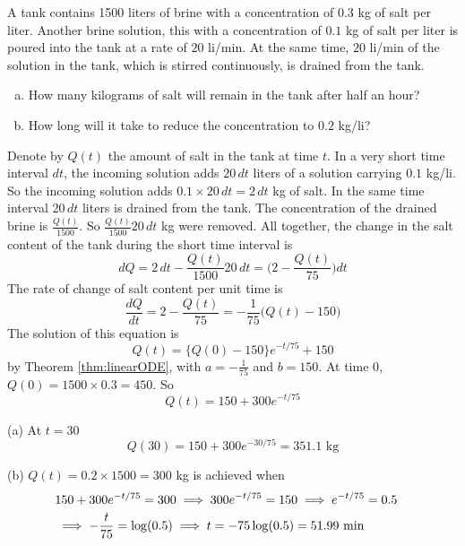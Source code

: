 \begin{eg}\label{eg:SDEmixingB}
A tank contains 1500 liters of brine with a concentration of $0.3$ kg of
salt per liter. Another brine solution, this with a concentration of
$0.1$ kg of salt per liter is poured into the tank at a rate of $20$ li/min.
At the same time, $20$ li/min of the solution in the tank, which is stirred
continuously, is drained from the tank.
\begin{enumerate}[(a)]
\item How many kilograms of salt will remain in the tank after
half an hour?
\item How long will it take to reduce the concentration to $0.2$
kg/li?
\end{enumerate}

\soln
Denote by $Q(t)$ the amount of salt in the tank at time $t$.
In a very short time interval $dt$, the incoming solution adds $20\, dt$
liters of a solution carrying $0.1$ kg/li. So the incoming solution adds
$0.1\times 20\, dt=2\, dt$ kg of salt. In the same time interval
$20\, dt$ liters is drained from the tank. The concentration of the
drained brine is $\frac{Q(t)}{1500}$. So $\frac{Q(t)}{1500} 20\, dt$ kg were
removed. All together, the change in the salt content of the tank during
the short time interval is
\begin{equation*}
dQ=2\, dt-\frac{Q(t)}{1500} 20\, dt
=\Big(2-\frac{Q(t)}{75}\Big) dt
\end{equation*}
The rate of change of salt content per unit time is
\begin{equation*}
\frac{dQ}{dt}=2-\frac{Q(t)}{75}
=-\frac{1}{75}\big(Q(t)-150\big)
\end{equation*}
The solution of this equation  is
\begin{equation*}
Q(t)=\big\{Q(0)-150\big\}e^{-t/75} + 150
\end{equation*}
by Theorem \ref{thm:linearODE}, with $a=-\frac{1}{75}$ and $b=150$.
At time $0$, $Q(0)=1500\times 0.3=450$. So
\begin{equation*}
Q(t)=150+300e^{-t/75}
\end{equation*}

\noindent (a) At $t=30$
\begin{equation*}
Q(30)=150+300e^{-30/75}=\text{351.1 kg}
\end{equation*}

\noindent (b) $Q(t)=0.2\times 1500=300$ kg is achieved when
\begin{align*}
&150+300e^{-t/75}=300\implies 300e^{-t/75}=150
\implies e^{-t/75}=0.5\cr
&\implies -\frac{t}{75}=\log (0.5)
\implies t=-75\log (0.5)=\text{51.99 min}
\end{align*}
\end{eg}

